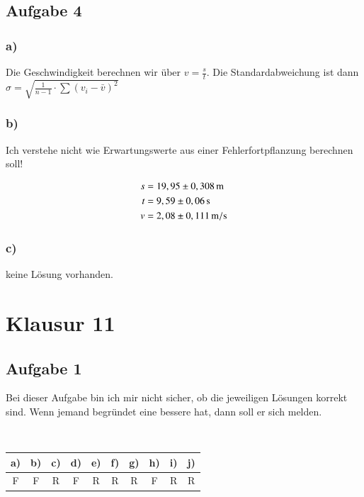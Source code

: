 \newpage

\subsection{Aufgabe 4}

\subsubsection*{a)}


Die Geschwindigkeit berechnen wir über $v = \frac{s}{t}$. Die Standardabweichung ist dann $\sigma = \sqrt{\frac{1}{n-1} \cdot \sum \left( v_i - \bar{v} \right)^2}$


\subsubsection*{b)}

Ich verstehe nicht wie Erwartungswerte aus einer Fehlerfortpflanzung berechnen soll!

\begin{align*}
s &= \unit[19,95 \pm 0,308]{m} \\
t &= \unit[9,59 \pm 0,06]{s} \\
v &= \unit[2,08 \pm 0,111]{m/s}
\end{align*}


\subsubsection*{c)}

keine Lösung vorhanden.



\section{Klausur 11}

\subsection{Aufgabe 1}

Bei dieser Aufgabe bin ich mir nicht sicher, ob die jeweiligen Lösungen korrekt sind. Wenn jemand begründet eine bessere hat, dann soll er sich melden.

\hfill\\

\begin{center}
\begin{tabular}{c|c|c|c|c|c|c|c|c|c}
a) & b) & c) & d) & e) & f) & g) & h) & i) & j) \\ 
\hline 
F & F & R & F & R & R & R & F & R & R \\ 
\end{tabular} 
\end{center}


